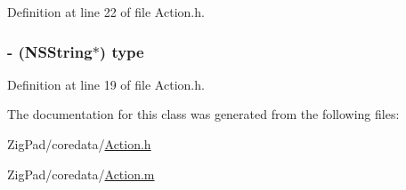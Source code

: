 Definition at line 22 of file Action.h.

\hypertarget{interface_action_abff6a04d71c2bba87e646615388a1f5c}{
\subsubsection[{type}]{\setlength{\rightskip}{0pt plus 5cm}-\/ (NSString$\ast$) type}}
\label{interface_action_abff6a04d71c2bba87e646615388a1f5c}


Definition at line 19 of file Action.h.



The documentation for this class was generated from the following files:\begin{DoxyCompactItemize}
\item 
ZigPad/coredata/\hyperlink{_action_8h}{Action.h}\item 
ZigPad/coredata/\hyperlink{_action_8m}{Action.m}\end{DoxyCompactItemize}
